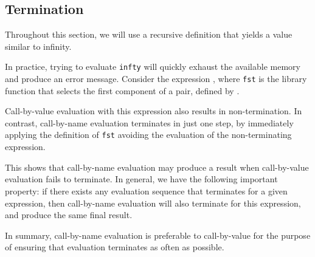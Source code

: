 \subsection{Termination}\label{subsec:Termination}
Throughout this section, we will use a recursive definition that yields a value similar to infinity.

In practice, trying to evaluate \texttt{infty} will quickly exhaust the available memory and produce an error message.
Consider the expression , where \texttt{fst} is the library function that selects the first component of a pair, defined by .

Call-by-value evaluation with this expression also results in non-termination.
In contrast, call-by-name evaluation terminates in just one step, by immediately applying the definition of \texttt{fst} avoiding the evaluation of the non-terminating expression.

This shows that call-by-name evaluation may produce a result when call-by-value evaluation fails to terminate.
In general, we have the following important property: if there exists any evaluation sequence that terminates for a given expression, then call-by-name evaluation will also terminate for this expression, and produce the same final result.

In summary, call-by-name evaluation is preferable to call-by-value for the purpose of ensuring that evaluation terminates as often as possible.


